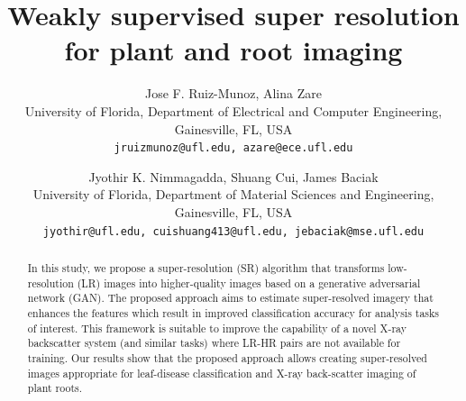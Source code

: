 \documentclass[10pt,twocolumn,letterpaper]{article}
\begin{document}
\title{Weakly supervised super resolution for plant and root imaging}

\author{Jose F. Ruiz-Munoz, Alina Zare \\
University of Florida, Department of Electrical and Computer Engineering, Gainesville, FL, USA\\
{\tt\small jruizmunoz@ufl.edu, azare@ece.ufl.edu}
\and
Jyothir K. Nimmagadda, Shuang Cui, James Baciak \\
University of Florida, Department of Material Sciences and Engineering, Gainesville, FL, USA\\
{\tt\small jyothir@ufl.edu, cuishuang413@ufl.edu, jebaciak@mse.ufl.edu}
}

\maketitle

\begin{abstract}
    In this study, we propose a super-resolution (SR) algorithm that transforms low-resolution (LR) images into higher-quality images based on a generative adversarial network (GAN). The proposed approach aims to estimate super-resolved imagery that enhances the features which result in improved classification accuracy for analysis tasks of interest. This framework is suitable to improve the capability of a novel X-ray backscatter system (and similar tasks) where LR-HR pairs are not available for training. Our results show that the proposed approach allows creating super-resolved images appropriate for leaf-disease classification and X-ray back-scatter imaging of plant roots.
\end{abstract}

\end{document}
